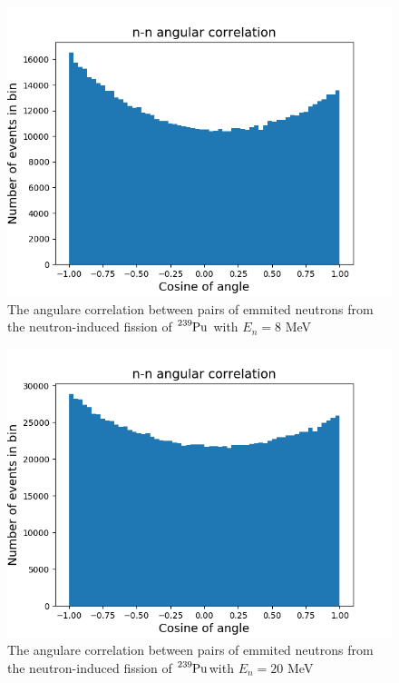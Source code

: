 \documentclass[]{article}
\begin{document}
\begin{figure} [H]
	\centering
	\includegraphics[scale=0.65]{Pu239_8_n_n_ang_corr.png}
	\caption{The angulare correlation between pairs of emmited neutrons from the neutron-induced fission of $\ce{^{239}Pu}$ with $E_n= 8$ MeV}
	\label{fig:Pu239_8_n_n_ang_corr}
\end{figure}

\begin{figure} [H]
	\centering
	\includegraphics[scale=0.65]{Pu239_20_n_n_ang_corr.png}
	\caption{The angulare correlation between pairs of emmited neutrons from the neutron-induced fission of $\ce{^{239}Pu}$with $E_n= 20$ MeV}
	\label{fig:Pu239_20_n_n_ang_corr}
\end{figure}
\end{document}
